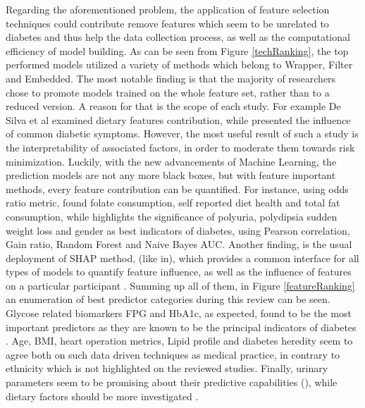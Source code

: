\documentclass[journal,article,submit,pdftex,moreauthors]{Definitions/mdpi}
\begin{document}
Regarding the aforementioned problem, the application of feature selection techniques could contribute remove features which seem to be
unrelated to diabetes and thus help the data collection process, as well as the computational efficiency of model building.
As can be seen from Figure \ref{techRanking}, the top performed models utilized a variety of methods which belong to Wrapper,
Filter and Embedded. The most notable finding is that the majority of researchers chose to promote models trained on the whole 
feature set, rather than to a reduced version. A reason for that is the scope of each study. For example De Silva et al \cite{DeSilva}
examined dietary features contribution, while \cite{Dritsas} presented the influence of common diabetic symptoms.
However, the most useful result of such a study is the interpretability of associated factors, in order to moderate them towards
risk minimization. Luckily, with the new advancements of Machine Learning, the prediction models are not any more black boxes, but
with feature important methods, every feature contribution can be quantified. For instance, \cite{DeSilva} using odds ratio metric,
found folate consumption, self reported diet health and total fat consumption, while \cite{Dritsas} highlights the significance of
polyuria, polydipsia sudden weight loss and gender as best indicators of diabetes, using Pearson correlation,
Gain ratio, Random Forest and Naive Bayes AUC. Another finding, is the usual deployment of SHAP method,
(like in\cite{LAMA2021e07419,Qin,Shin,Mao}), which provides a common interface for all types of models to quantify feature influence, as
well as the influence of features on a particular participant \cite{LAMA2021e07419}. Summing up all of them, 
in Figure \ref{featureRanking} an enumeration of best predictor categories during this review can be seen.
Glycose related biomarkers FPG and HbA1c, as expected, found to be the most important predictors as they are known to be the principal
indicators of diabetes \cite{idf}. Age, BMI, heart operation metrics, Lipid profile and diabetes heredity seem to agree both on 
such data driven techniques as medical practice, in contrary to ethnicity which is not highlighted on the reviewed studies.
Finally, urinary parameters seem to be promising about their predictive capabilities (\cite{Dritsas,zhang}), while dietary factors should be more 
investigated \cite{DeSilva,zhang,LAMA2021e07419}. 
\end{document}
